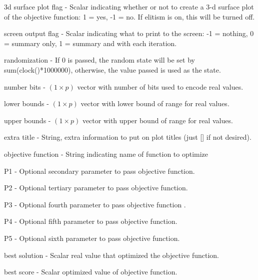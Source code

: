 \documentclass{book}
\newcommand{\textcode}[1]{\textsf{\small #1}}   %
\begin{document}
\begin{compactitem}
\begin{compactenum}
\item \textcode{3d surface
plot flag} - Scalar indicating whether or not to create a 3-d surface plot
of the objective function: 1 = yes, -1 = no. If \textcode{elitism} is on,
this will be turned off.

\item \textcode{screen output flag} - Scalar
indicating what to print to the screen: -1 = nothing, 0 = summary only, 1 =
summary and with each iteration.

\item \textcode{randomization} - If 0 is
passed, the random state will be set by \textcode{sum(clock()*1000000)},
otherwise, the value passed is used as the state.

\end{compactenum}%


\item \textcode{number bits} - $\left( 1 \times p \right)$ vector with
number of bits used to encode real values.

\item \textcode{lower bounds}
- $\left( 1 \times p \right)$ vector with lower bound of range for real
values.

\item \textcode{upper bounds} - $\left( 1 \times p \right)$
vector with upper bound of range for real values.

\item \textcode{extra
title} - String, extra information to put on plot titles (just [] if not
desired).

\item \textcode{objective function} - String indicating name of
function to optimize

\item \textcode{P1} - Optional secondary parameter
to pass \textcode{objective function}.

\item \textcode{P2} -  Optional
tertiary parameter to pass \textcode{objective function}.

\item \textcode{%
P3} - Optional fourth parameter to pass \textcode{objective function}%
.

\item \textcode{P4} - Optional fifth parameter to pass \textcode{%
objective function}.

\item \textcode{P5} - Optional sixth parameter to
pass \textcode{objective function}.

\item \textcode{best solution} -
Scalar real value that optimized the \textcode{objective function}.

\item
\textcode{best score} - Scalar optimized value of \textcode{objective
function}.

\end{compactitem}
\end{document}
